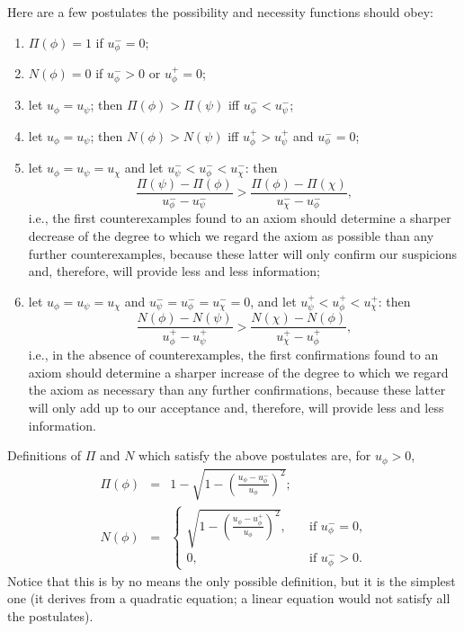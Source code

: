 \documentclass{sig-alternate}
\begin{document}
Here are a few postulates the possibility
and necessity functions should obey:
\begin{enumerate}
\item $\Pi(\phi) = 1$ if $u_\phi^- = 0$;
\item $N(\phi) = 0$ if $u_\phi^- > 0$ or $u_\phi^+ = 0$;
\item let $u_\phi = u_\psi$; then $\Pi(\phi) > \Pi(\psi)$ iff $u_\phi^- < u_\psi^-$;
\item let $u_\phi = u_\psi$; then $N(\phi) > N(\psi)$ iff $u_\phi^+ > u_\psi^+$ and $u_\phi^- = 0$;
\item let $u_\phi = u_\psi = u_\chi$ and let $u_\psi^- < u_\phi^- < u_\chi^-$: then
  \[
    \frac{\Pi(\psi) - \Pi(\phi)}{u_\phi^- - u_\psi^-} > \frac{\Pi(\phi) - \Pi(\chi)}{u_\chi^- - u_\phi^-},
  \]
  i.e., the first counterexamples found to an axiom should determine a sharper decrease
  of the degree to which we regard the axiom as possible than any further counterexamples,
  because these latter will only confirm our suspicions and, therefore, will provide
  less and less information;
\item let $u_\phi = u_\psi = u_\chi$ and $u_\psi^- = u_\phi^- = u_\chi^- = 0$,
  and let $u_\psi^+ < u_\phi^+ < u_\chi^+$: then
  \[
    \frac{N(\phi) - N(\psi)}{u_\phi^+ - u_\psi^+} > \frac{N(\chi) - N(\phi)}{u_\chi^+ - u_\phi^+},
  \]
  i.e., in the absence of counterexamples,
  the first confirmations found to an axiom should determine a sharper increase
  of the degree to which we regard the axiom as necessary than any further confirmations,
  because these latter will only add up to our acceptance and, therefore, will provide
  less and less information.%
\end{enumerate}

Definitions of $\Pi$ and $N$ which satisfy the above postulates are, for $u_\phi > 0$,
\begin{eqnarray}
  \label{eq:possibility}
  \Pi(\phi) &=& 1 - \sqrt{1 - \left(\frac{u_\phi - u_\phi^-}{u_\phi}\right)^2}; \\
  \label{eq:necessity}
  N(\phi) &=& \left\{\begin{array}{ll}
    \sqrt{1 - \left(\frac{u_\phi - u_\phi^+}{u_\phi}\right)^2},\quad & \mbox{if $u_\phi^- = 0$,}\\[1.5em]
    0, & \mbox{if $u_\phi^- > 0$.}
  \end{array}\right.
\end{eqnarray}
Notice that this is by no means the only possible definition, but 
it is the simplest one (it derives from a quadratic equation; a linear equation would
not satisfy all the postulates).
\end{document}
